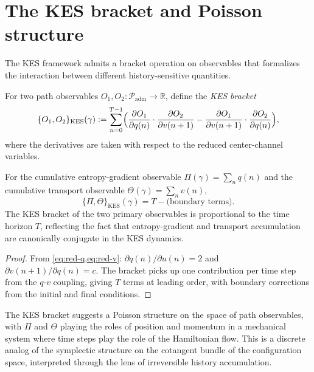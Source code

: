 \documentclass[12pt, oneside]{memoir}
\newcommand{\Padm}{\mathcal{P}_{\mathrm{adm}}}
\begin{document}
\section{The KES bracket and Poisson structure}

The KES framework admits a bracket operation on observables that formalizes the
interaction between different history-sensitive quantities.

\begin{definition}
\label{def:kes-bracket}
For two path observables $O_1, O_2: \Padm \to \mathbb{R}$, define the \emph{KES bracket}
\begin{equation}
  \{O_1, O_2\}_{\mathrm{KES}}(\gamma)
  := \sum_{n=0}^{T-1}
  \Bigl(
    \frac{\partial O_1}{\partial q(n)} \cdot \frac{\partial O_2}{\partial v(n+1)}
    - \frac{\partial O_1}{\partial v(n+1)} \cdot \frac{\partial O_2}{\partial q(n)}
  \Bigr),
\end{equation}
where the derivatives are taken with respect to the reduced center-channel variables.
\end{definition}

\begin{proposition}
\label{prop:kes-bracket}
For the cumulative entropy-gradient observable $\Pi(\gamma) = \sum_n q(n)$ and the
cumulative transport observable $\Theta(\gamma) = \sum_n v(n)$,
\begin{equation}
  \{\Pi, \Theta\}_{\mathrm{KES}}(\gamma) = T - \text{(boundary terms)}.
\end{equation}
The KES bracket of the two primary observables is proportional to the time horizon $T$,
reflecting the fact that entropy-gradient and transport accumulation are canonically
conjugate in the KES dynamics.
\end{proposition}

\begin{proof}
From \cref{eq:red-q,eq:red-v}: $\partial q(n) / \partial u(n) = 2$ and $\partial v(n+1)
/ \partial q(n) = c$.  The bracket picks up one contribution per time step from the
$q$-$v$ coupling, giving $T$ terms at leading order, with boundary corrections from the
initial and final conditions.
\end{proof}

The KES bracket suggests a Poisson structure on the space of path observables, with
$\Pi$ and $\Theta$ playing the roles of position and momentum in a mechanical system
where time steps play the role of the Hamiltonian flow.  This is a discrete analog of
the symplectic structure on the cotangent bundle of the configuration space, interpreted
through the lens of irreversible history accumulation.
\end{document}
